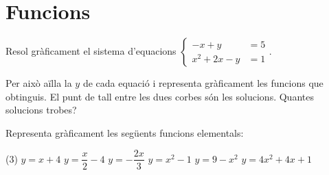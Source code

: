 \documentclass{article}
\let\frac\dfrac
\begin{document}
  
  \section{Funcions}
  
  \begin{mylist}
  	
  	\item Resol gràficament el sistema d'equacions 
  	$ \left\{ \begin{array}{rl}
  	-x+y &= 5 \\ x^2+2x-y&=1
  	\end{array} \right.$.
  	
  	Per això aïlla la $y$ de cada equació i representa gràficament les funcions que obtinguis. El punt de tall entre les dues corbes són les solucions. Quantes solucions trobes?
  	
  	\item Representa gràficament les següents funcions elementals:
  	
  	\begin{tasks}(3)
  		\task $y=x+4$
  		\task $y=\frac{x}{2}-4$
  		\task $y=-\frac{2x}{3}$
  		\task $y=x^2-1$
  		\task $y=9-x^2$	
  		\task $y=4x^2+4x+1$
  	\end{tasks} 
  	
  \end{mylist}
  \newpage
  \setcounter{myenumi}{0}
\end{document}
